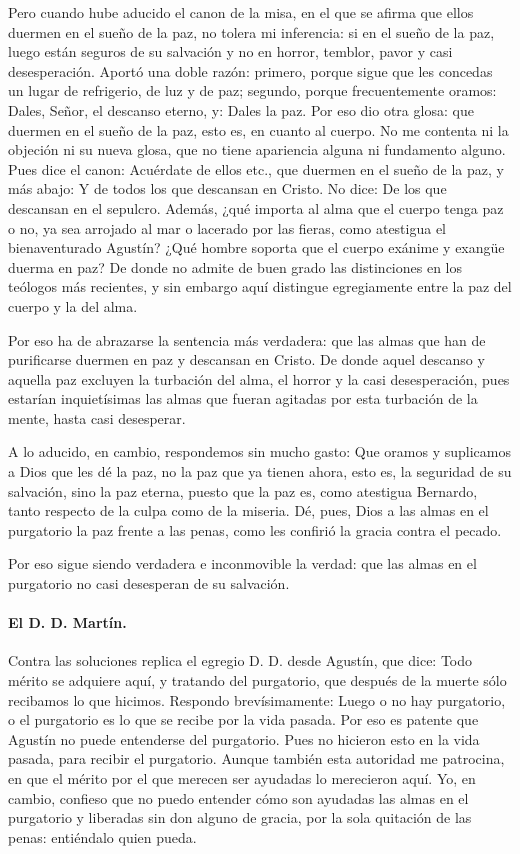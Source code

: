 Pero cuando hube aducido el canon de la misa, en el que se afirma que ellos duermen en el sueño de la paz, no tolera mi inferencia: si en el sueño de la paz, luego están seguros de su salvación y no en horror, temblor, pavor y casi desesperación. Aportó una doble razón: primero, porque sigue que les concedas un lugar de refrigerio, de luz y de paz; segundo, porque frecuentemente oramos: Dales, Señor, el descanso eterno, y: Dales la paz. Por eso dio otra glosa: que duermen en el sueño de la paz, esto es, en cuanto al cuerpo. No me contenta ni la objeción ni su nueva glosa, que no tiene apariencia alguna ni fundamento alguno. Pues dice el canon: Acuérdate de ellos etc., que duermen en el sueño de la paz, y más abajo: Y de todos los que descansan en Cristo. No dice: De los que descansan en el sepulcro. Además, ¿qué importa al alma que el cuerpo tenga paz o no, ya sea arrojado al mar o lacerado por las fieras, como atestigua el bienaventurado Agustín? ¿Qué hombre soporta que el cuerpo exánime y exangüe duerma en paz? De donde no admite de buen grado las distinciones en los teólogos más recientes, y sin embargo aquí distingue egregiamente entre la paz del cuerpo y la del alma.

Por eso ha de abrazarse la sentencia más verdadera: que las almas que han de purificarse duermen en paz y descansan en Cristo. De donde aquel descanso y aquella paz excluyen la turbación del alma, el horror y la casi desesperación, pues estarían inquietísimas las almas que fueran agitadas por esta turbación de la mente, hasta casi desesperar.

A lo aducido, en cambio, respondemos sin mucho gasto: Que oramos y suplicamos a Dios que les dé la paz, no la paz que ya tienen ahora, esto es, la seguridad de su salvación, sino la paz eterna, puesto que la paz es, como atestigua Bernardo, tanto respecto de la culpa como de la miseria. Dé, pues, Dios a las almas en el purgatorio la paz frente a las penas, como les confirió la gracia contra el pecado.

Por eso sigue siendo verdadera e inconmovible la verdad: que las almas en el purgatorio no casi desesperan de su salvación.

\paragraph*{El D. D. Martín.}

Contra las soluciones replica el egregio D. D. desde Agustín, que dice: Todo mérito se adquiere aquí, y tratando del purgatorio, que después de la muerte sólo recibamos lo que hicimos. Respondo brevísimamente: Luego o no hay purgatorio, o el purgatorio es lo que se recibe por la vida pasada. Por eso es patente que Agustín no puede entenderse del purgatorio. Pues no hicieron esto en la vida pasada, para recibir el purgatorio. Aunque también esta autoridad me patrocina, en que el mérito por el que merecen ser ayudadas lo merecieron aquí. Yo, en cambio, confieso que no puedo entender cómo son ayudadas las almas en el purgatorio y liberadas sin don alguno de gracia, por la sola quitación de las penas: entiéndalo quien pueda.

